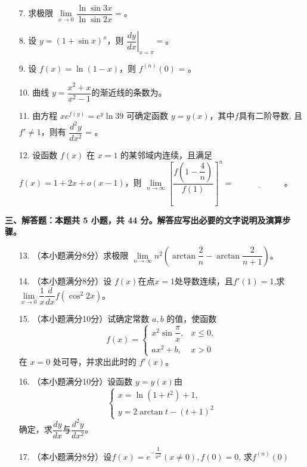 \documentclass[a4paper,12pt]{article}
\begin{document}
\begin{enumerate}
    \item[7.] 求极限 $\underset{x \to 0}{\lim} \dfrac{\ln \sin 3x}{\ln \sin 2x} = $\underline{\qquad\qquad\qquad}。
    
    \item[8.] 设 $y = (1+\sin{x})^x$，则 $\left. \dfrac{dy}{dx} \right|_{x=\pi} = $\underline{\qquad\qquad\qquad}。
    
    \item[9.] 设 $f(x) = \ln{(1-x)} $，则 $ f^{(n)}(0) $ = \underline{\qquad\qquad\qquad}。
    
    \item[10.] 曲线 \( y = \dfrac{x^2 +x}{x^2 -1} \)的渐近线的条数为\underline{\qquad\qquad\qquad}。

    \item[11.] 由方程 \( xe^{f(y)} = e^y \ln{39} \) 可确定函数 \( y = y(x) \)，其中\(f \)具有二阶导数, 且\(f'\neq1\)，则有 \( \dfrac{d^2 y}{dx^2} \) = \underline{\qquad\qquad\qquad}。

    \item[12.] 设函数 \( f(x) \) 在 \( x = 1 \) 的某邻域内连续，且满足 \( f(x) = 1 + 2x + o(x - 1) \)，则 \( \underset{n \to \infty}{\lim} \left[ \dfrac{f\left(1 - \dfrac{4}{n}\right)}{f(1)} \right]^n = \underline{\qquad\qquad\qquad} \)。

\end{enumerate}

\noindent
\textbf{三、解答题：本题共 5 小题，共 44 分。解答应写出必要的文字说明及演算步骤。}

\begin{enumerate}
    \item[13.]（本小题满分8分）求极限 \( \underset{n \to \infty}{\lim} n^2 \left( \arctan \dfrac{2}{n} - \arctan \dfrac{2}{n+1} \right) \)。

    \item[14.]（本小题满分8分）设 $f(x) $在点$x=1 $处导数连续，且$f'(1)=1$,求$\underset{x \to 0}{\lim}\dfrac{1}{x}\dfrac{d}{dx}f(\cos^2{2x})$。

    \item[15.]（本小题满分10分）试确定常数 \( a, b \) 的值，使函数
    \[
    f(x) = \begin{cases}
        x^2 \sin{\dfrac{\pi}{x}}, & x \leq 0, \\
        ax^2 + b, & x > 0
    \end{cases}
    \]
    在 \( x = 0 \) 处可导，并求出此时的 \( f'(x) \)。


    \item[16.]（本小题满分10分）设函数 \( y=y(x) \)由
    \[
    \begin{cases}
        x=\ln{(1+t^2)}+1, \\
        y=2\arctan{t} - (t+1)^2
    \end{cases}
    \]
    确定，求\( \dfrac{dy}{dx} \)与\( \dfrac{d^2 y}{dx^2} \)。

    \item[17.]（本小题满分8分）设$f(x)=e^{-\dfrac{1}{x^2}}(x\neq0),f(0)=0$, 求$f^{(n)}(0)$

\end{enumerate}
\end{document}
